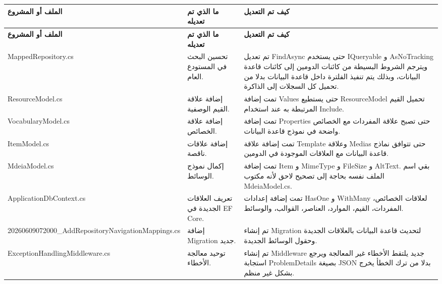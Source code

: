 \documentclass[12pt,a4paper]{article}
\begin{document}
\begin{longtable}{|p{4cm}|p{5.5cm}|p{5.5cm}|}
\hline
\textbf{الملف أو المشروع} & \textbf{ما الذي تم تعديله} & \textbf{كيف تم التعديل} \\
\hline
\endfirsthead

\hline
\textbf{الملف أو المشروع} & \textbf{ما الذي تم تعديله} & \textbf{كيف تم التعديل} \\
\hline
\endhead

\textenglish{MappedRepository.cs} &
تحسين البحث في المستودع العام. &
تم تعديل \textenglish{FindAsync} حتى يستخدم \textenglish{IQueryable} و \textenglish{AsNoTracking} ويترجم الشروط البسيطة من كائنات الدومين إلى كائنات قاعدة البيانات، وبذلك يتم تنفيذ الفلترة داخل قاعدة البيانات بدلا من تحميل كل السجلات إلى الذاكرة. \\
\hline

\textenglish{ResourceModel.cs} &
إضافة علاقة القيم الوصفية. &
تمت إضافة \textenglish{Values} حتى يستطيع \textenglish{ResourceModel} تحميل القيم المرتبطة به عند استخدام \textenglish{Include}. \\
\hline

\textenglish{VocabularyModel.cs} &
إضافة علاقة الخصائص. &
تمت إضافة \textenglish{Properties} حتى تصبح علاقة المفردات مع الخصائص واضحة في نموذج قاعدة البيانات. \\
\hline

\textenglish{ItemModel.cs} &
إضافة علاقات ناقصة. &
تمت إضافة علاقة \textenglish{Template} وعلاقة \textenglish{Medias} حتى تتوافق نماذج قاعدة البيانات مع العلاقات الموجودة في الدومين. \\
\hline

\textenglish{MdeiaModel.cs} &
إكمال نموذج الوسائط. &
تمت إضافة \textenglish{Item} و \textenglish{MimeType} و \textenglish{FileSize} و \textenglish{AltText}. بقي اسم الملف نفسه بحاجة إلى تصحيح لاحق لأنه مكتوب \textenglish{MdeiaModel.cs}. \\
\hline

\textenglish{ApplicationDbContext.cs} &
تعريف العلاقات الجديدة في EF Core. &
تمت إضافة إعدادات \textenglish{HasOne} و \textenglish{WithMany} لعلاقات الخصائص، المفردات، القيم، الموارد، العناصر، القوالب، والوسائط. \\
\hline

\textenglish{20260609072000\_AddRepositoryNavigationMappings.cs} &
إضافة Migration جديد. &
تم إنشاء Migration لتحديث قاعدة البيانات بالعلاقات الجديدة وحقول الوسائط الجديدة. \\
\hline

\textenglish{ExceptionHandlingMiddleware.cs} &
توحيد معالجة الأخطاء. &
تم إنشاء Middleware جديد يلتقط الأخطاء غير المعالجة ويرجع استجابة \textenglish{ProblemDetails} بصيغة JSON بدلا من ترك الخطأ يخرج بشكل غير منظم. \\
\hline


\end{longtable}
\end{document}
